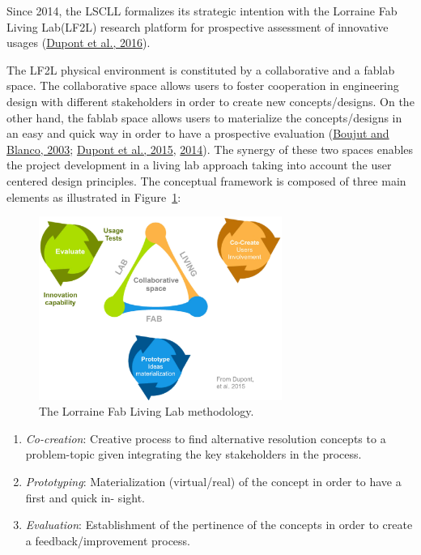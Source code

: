 \documentclass[
  11pt,
]{article}
\providecommand{\tightlist}{%
  \setlength{\itemsep}{0pt}\setlength{\parskip}{0pt}}\usepackage{longtable,booktabs,array}
\begin{document}
Since 2014, the LSCLL formalizes its strategic intention with the
Lorraine Fab Living Lab\textregistered (LF2L\textregistered) research
platform for prospective assessment of innovative usages
(\protect\hyperlink{ref-Dupont2016}{Dupont et al., 2016}).

The LF2L physical environment is constituted by a collaborative and a
fablab space. The collaborative space allows users to foster cooperation
in engineering design with different stakeholders in order to create new
concepts/designs. On the other hand, the fablab space allows users to
materialize the concepts/designs in an easy and quick way in order to
have a prospective evaluation (\protect\hyperlink{ref-Boujut2003}{Boujut
and Blanco, 2003}; \protect\hyperlink{ref-Dupont2015b}{Dupont et al.,
2015}, \protect\hyperlink{ref-Dupont2014}{2014}). The synergy of these
two spaces enables the project development in a living lab approach
taking into account the user centered design principles. The conceptual
framework is composed of three main elements as illustrated in
Figure~\ref{fig-lf2l-methodology}:

\begin{figure}[H]

{\centering \includegraphics[width=3.125in,height=\textheight]{figures/lf2l/Methodology-01.jpg}

}

\caption{\label{fig-lf2l-methodology}The Lorraine Fab Living Lab
methodology.}

\end{figure}

\begin{enumerate}
\def\labelenumi{\arabic{enumi}.}
\tightlist
\item
  \emph{Co-creation}: Creative process to find alternative resolution
  concepts to a problem-topic given integrating the key stakeholders in
  the process.
\item
  \emph{Prototyping}: Materialization (virtual/real) of the concept in
  order to have a first and quick in- sight.
\item
  \emph{Evaluation}: Establishment of the pertinence of the concepts in
  order to create a feedback/improvement process.
\end{enumerate}
\end{document}
